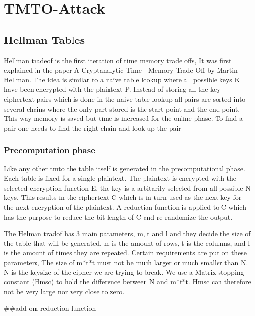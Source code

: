 \chapter{TMTO-Attack}
\label{ch:tmto}

\section{Hellman Tables}
Hellman tradeof is the first iteration of time memory trade offs, It was first explained in the paper A Cryptanalytic Time - Memory Trade-Off by Martin Hellman.
The idea is similar to a naive table lookup where all possible keys K have been encrypted with the plaintext P. Instead of storing all the key ciphertext pairs which is done in the naive table lookup all pairs are sorted into several chains where the only part stored is the start point and the end point. This way memory is saved but time is increased for the online phase. To find a pair one needs to find the right chain and look up the pair.


\subsection*{Precomputation phase}
Like any other tmto the table itself is generated in the precomputational phase. Each table is fixed for a single plaintext. The plaintext is encrypted with the selected encryption function E, the key is a arbitarily selected from all possible N keys. This results in the ciphertext C which is in turn used as the next key for the next encryption of the plaintext. A reduction function is applied to C which has the purpose to reduce the bit length of C and re-randomize the output.

The Helman tradof has 3 main parameters, m, t and l and they decide the size of the table that will be generated.
m is the amount of rows, t is the columns, and l is the amount of times they are repeated.
Certain requirements are put on these parameters, The size of m*t*t must not be much larger or much smaller than N.
N is the keysize of the cipher we are trying to break. We use a Matrix stopping constant (Hmsc) to hold the difference between N and m*t*t. Hmsc can therefore not be very large nor very close to zero.

##add om reduction function

